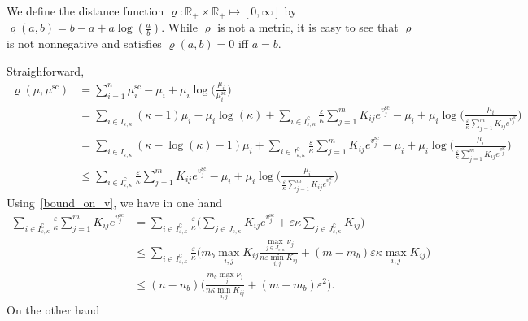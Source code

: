 \documentclass{article}
\newcommand{\R}{{\mathbb{R}}}
\begin{document}
We define the distance function $\varrho: \R_+ \times \R_+ \mapsto [0, \infty]$ by $\varrho(a,b) = b - a + a \log(\frac ab).$
While $\varrho$ is not a metric, it is easy to see that $\varrho$ is not nonnegative and satisfies $\varrho(a,b) =0$ iff $a=b$.

Straighforward, 
\begin{align*}
\varrho({\mu} ,{\mu}^{\text{sc}}) &= \sum_{i=1}^n  {\mu}^{\text{sc}}_i - {\mu}_i + {\mu}_i  \log\Big(\frac{{\mu}_i}{{\mu}^{\text{sc}}_i }\Big)\\
&= \sum_{i\in I_{\varepsilon,\kappa}} (\kappa-1)\mu_i - \mu_i\log(\kappa) + \sum_{i\in I^\complement_{\varepsilon,\kappa}}\frac \varepsilon\kappa\sum_{j=1}^m K_{ij} e^{v^{\text{sc}}_j} - \mu_i + \mu_i \log\Big(\frac{\mu_i}{\frac \varepsilon\kappa\sum_{j=1}^m K_{ij} e^{v^{\text{sc}}_j}}\Big)\\
&= \sum_{i\in I_{\varepsilon,\kappa}} (\kappa-\log(\kappa)-1)\mu_i  + \sum_{i\in I^\complement_{\varepsilon,\kappa}}\frac \varepsilon\kappa\sum_{j=1}^m K_{ij} e^{v^{\text{sc}}_j} - \mu_i + \mu_i \log\Big(\frac{\mu_i}{\frac \varepsilon\kappa\sum_{j=1}^m K_{ij} e^{v^{\text{sc}}_j}}\Big)\\
&\leq  \sum_{i\in I^\complement_{\varepsilon,\kappa}}\frac \varepsilon\kappa\sum_{j=1}^m K_{ij} e^{v^{\text{sc}}_j} - \mu_i + \mu_i \log\Big(\frac{\mu_i}{\frac \varepsilon\kappa\sum_{j=1}^m K_{ij} e^{v^{\text{sc}}_j}}\Big)
\end{align*}
Using~\eqref{bound_on_v}, we have in one hand 
\begin{align*}
\sum_{i\in I^\complement_{\varepsilon,\kappa}}\frac \varepsilon\kappa\sum_{j=1}^m K_{ij} e^{v^{\text{sc}}_j}&= \sum_{i\in I^\complement_{\varepsilon,\kappa}}\frac \varepsilon\kappa \Big(\sum_{j\in J_{\varepsilon,\kappa}}K_{ij} e^{v^{\text{sc}}_j} + \varepsilon \kappa\sum_{j\in J^\complement_{\varepsilon,\kappa}}K_{ij}\Big)\\
&\leq \sum_{i\in I^\complement_{\varepsilon,\kappa}}\frac \varepsilon\kappa \Big(m_b \max_{i,j}K_{ij}\frac{\max_{j \in J_{\varepsilon,\kappa}} \nu_j}{n\varepsilon\min_{i,j}K_{ij}} + (m - m_b)\varepsilon\kappa\max_{i,j}K_{ij}\Big) \\
&\leq (n-n_b)\Big(\frac{m_b\max_{j} \nu_j}{n\kappa\min_{i,j} K_{ij}} + (m- m_b) \varepsilon^2\Big).
\end{align*}
On the other hand 
\end{document}
